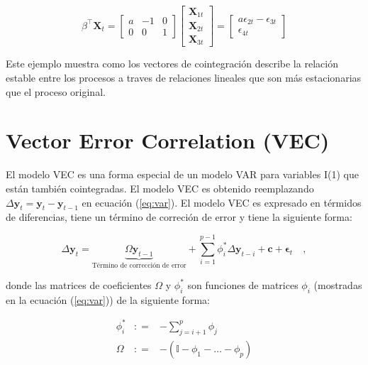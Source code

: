 \[
\beta^\intercal \mathbf{X}_t = 
\begin{bmatrix}
a & -1 & 0 \\
0 & 0 & 1
\end{bmatrix} 
\begin{bmatrix} 
\mathbf{X}_{1t} \\
\mathbf{X}_{2t} \\
\mathbf{X}_{3t}
\end{bmatrix} = 
\begin{bmatrix}
a\epsilon_{2t} - \epsilon_{3t} \\
\epsilon_{4t}
\end{bmatrix}
\]

Este ejemplo muestra como los vectores de cointegración describe la relación
estable entre los procesos a traves de relaciones lineales que son más
estacionarias que el proceso original.

\section{Vector Error Correlation (VEC)}

El modelo VEC es una forma especial de un modelo VAR para variables I(1) que
están también cointegradas. El modelo VEC es obtenido reemplazando
$\Delta \mathbf{y}_t = \mathbf{y}_t - \mathbf{y}_{t-1}$ en ecuación
(\ref{eq:var}). El modelo VEC es expresado en térmidos de diferencias,
tiene un término de correción de error y tiene la siguiente forma:

\begin{equation}
 \label{eq:vec}
  \Delta \mathbf{y}_t = 
   \underbrace{ \Omega\mathbf{y}_{t-1}}_\text{Término de corrección de error} + 
    \sum_{i=1}^{p-1}
    \phi_i^* \Delta \mathbf{y}_{t-i}  + \mathbf{c} + \mathbf{\epsilon}_t \quad ,
    \end{equation}

    \noindent donde las matrices de coeficientes $\Omega$ y $\phi_i^*$ son
    funciones de matrices $\phi_i$ (mostradas en la ecuación (\ref{eq:var})) de
    la siguiente forma:

    \begin{eqnarray*}
    \phi_i^* &: =& -\sum_{j=i+1}^{p} \phi_j \\
    \Omega &: =& -(\mathbb{I}-\phi_1-\dots-\phi_p) 
    \end{eqnarray*}

